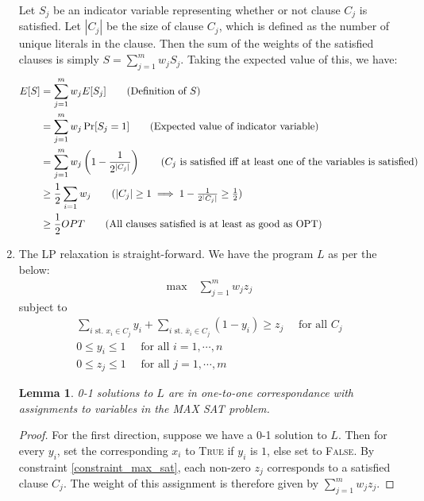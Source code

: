 \documentclass[12pt]{exam}
\newtheorem{lemma}[theorem]{Lemma}
\begin{document}
\begin{questions}
\begin{solution}
\begin{enumerate}[label=(\alph*)]
      Let $S_j$ be an indicator variable representing whether or not clause $C_j$ is satisfied. Let $|C_j|$ be the size of clause $C_j$, which is defined as the number of unique literals in the clause. Then the sum of the weights of the satisfied clauses is simply $S = \sum_{j=1}^m w_j S_j$. Taking the expected value of this, we have:
      \begin{align*}
        E[S] &= \sum_{j=1}^m w_j E[S_j] \tag{Definition of $S$} \\ 
        &= \sum_{j=1}^m w_j \Pr[S_j = 1] \tag{Expected value of indicator variable} \\
        &= \sum_{j=1}^m w_j \left(1 -  \frac{1}{2^{|C_j|}}\right) \tag{$C_j$ is satisfied iff at least one of the variables is satisfied} \\
        &\geq \frac{1}{2} \sum_{i=1} w_j \tag{$|C_j| \geq 1 \implies 1 - \frac{1}{2^|C_j|} \geq \frac{1}{2}$} \\
        &\geq \frac{1}{2}OPT \tag{All clauses satisfied is at least as good as OPT}
      \end{align*}
    \item
      The LP relaxation is straight-forward. We have the program $L$ as per the below:
      \begin{align}
        \text{max} \quad \sum_{j=1}^m w_j z_j 
      \end{align}
      subject to
      \begin{align}
        \sum_{i \text{ st. } x_i \in C_j} y_i + \sum_{i \text{ st. } \bar{x}_i \in C_j} (1 - y_i) \geq z_j \quad \text{ for all } C_j \label{constraint_max_sat} \\
        0 \leq y_i \leq 1 \quad \text{ for all } i = 1, \cdots, n \\
        0 \leq z_j \leq  1 \quad \text{ for all } j = 1, \cdots, m
      \end{align}
      \begin{lemma}
        0-1 solutions to $L$ are in one-to-one correspondance with assignments to variables in the MAX SAT problem.
      \end{lemma}
      \begin{proof}
        For the first direction, suppose we have a 0-1 solution to $L$. Then for every $y_i$, set the corresponding $x_i$ to \textsc{True} if $y_i$ is $1$, else set to \textsc{False}. By constraint \ref{constraint_max_sat}, each non-zero $z_j$ corresponds to a satisfied clause $C_j$. The weight of this assignment is therefore given by $\sum_{j=1}^m w_j z_j$.


\end{proof}
\end{enumerate}
\end{solution}
\end{questions}
\end{document}
